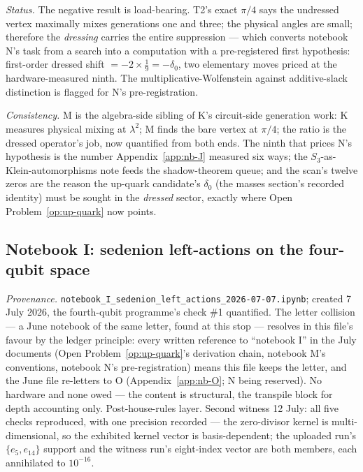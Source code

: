 \emph{Status.} The negative result is load-bearing. T2's exact $\pi/4$ says the undressed vertex
maximally mixes generations one and three; the physical angles are small; therefore the
\emph{dressing} carries the entire suppression --- which converts notebook N's task from a search
into a computation with a pre-registered first hypothesis: first-order dressed shift
$= -2 \times \tfrac19 = -\delta_{0}$, two elementary moves priced at the hardware-measured
ninth. The multiplicative-Wolfenstein against additive-slack distinction is flagged for N's
pre-registration.

\emph{Consistency.} M is the algebra-side sibling of K's circuit-side generation work: K measures
physical mixing at $\lambda^{2}$; M finds the bare vertex at $\pi/4$; the ratio is the dressed
operator's job, now quantified from both ends. The ninth that prices N's hypothesis is the number
Appendix~\ref{app:nb-J} measured six ways; the $S_{3}$-as-Klein-automorphisms note feeds the
shadow-theorem queue; and the scan's twelve zeros are the reason the up-quark candidate's
$\delta_{0}$ (the masses section's recorded identity) must be sought in the \emph{dressed}
sector, exactly where Open Problem~\ref{op:up-quark} now points.

\subsection{Notebook I: sedenion left-actions on the four-qubit space}
\label{app:nb-I}

\emph{Provenance.} \texttt{notebook\_I\_sedenion\_left\_actions\_2026-07-07.ipynb}; created
7 July 2026, the fourth-qubit programme's check \#1 quantified. The letter collision --- a June
notebook of the same letter, found at this stop --- resolves in this file's favour by the ledger
principle: every written reference to ``notebook I'' in the July documents (Open
Problem~\ref{op:up-quark}'s derivation chain, notebook M's conventions, notebook N's
pre-registration) means this file keeps the letter, and the June file re-letters to O
(Appendix~\ref{app:nb-O}; N being reserved). No hardware and none owed --- the content is
structural, the transpile block for depth accounting only. Post-house-rules layer. Second
witness 12 July: all five checks reproduced, with one precision recorded --- the zero-divisor
kernel is multi-dimensional, so the exhibited kernel vector is basis-dependent; the uploaded
run's $\{e_{5}, e_{14}\}$ support and the witness run's eight-index vector are both members,
each annihilated to $10^{-16}$.

